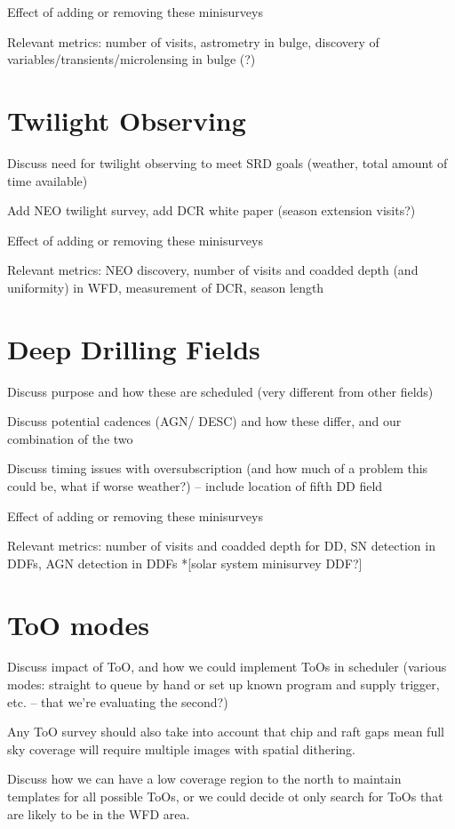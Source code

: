 Effect of adding or removing these minisurveys

Relevant metrics: number of visits, astrometry in bulge, discovery of variables/transients/microlensing in bulge (?)

\section{Twilight Observing}
Discuss need for twilight observing to meet SRD goals (weather, total amount of time available)

Add NEO twilight survey, add DCR white paper (season extension visits?)

Effect of adding or removing these minisurveys

Relevant metrics: NEO discovery, number of visits and coadded depth (and uniformity) in WFD, measurement of DCR, season length

\section{Deep Drilling Fields}
Discuss purpose and how these are scheduled (very different from other fields)

Discuss potential cadences (AGN/ DESC) and how these differ, and our combination of the two

Discuss timing issues with oversubscription (and how much of a problem this could be, what if worse weather?) -- include location of fifth DD field

Effect of adding or removing these minisurveys

Relevant metrics: number of visits and coadded depth for DD, SN detection in DDFs, AGN detection in DDFs
*[solar system minisurvey DDF?]

\section{ToO modes}
Discuss impact of ToO, and how we could implement ToOs in scheduler (various modes: straight to queue by hand or set up known program and supply trigger, etc. -- that we're evaluating the second?)

Any ToO survey should also take into account that chip and raft gaps mean full sky coverage will require multiple images with spatial dithering.

Discuss how we can have a low coverage region to the north to maintain templates for all possible ToOs, or we could decide ot only search for ToOs that are likely to be in the WFD area.

